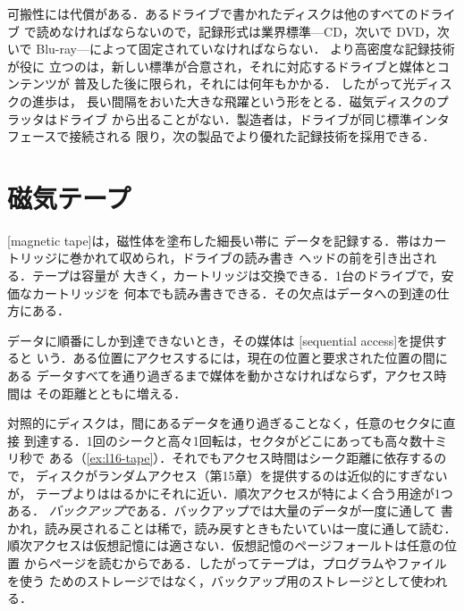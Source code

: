 \documentclass[../main.tex]{subfiles}
\begin{document}
可搬性には代償がある．あるドライブで書かれたディスクは他のすべてのドライブ
で読めなければならないので，記録形式は業界標準---CD，次いで DVD，次いで
Blu-ray---によって固定されていなければならない．
より高密度な記録技術が役に
立つのは，新しい標準が合意され，それに対応するドライブと媒体とコンテンツが
普及した後に限られ，それには何年もかかる．
したがって光ディスクの進歩は，
長い間隔をおいた大きな飛躍という形をとる．磁気ディスクのプラッタはドライブ
から出ることがない．製造者は，ドライブが同じ標準インタフェースで接続される
限り，次の製品でより優れた記録技術を採用できる．

\section{磁気テープ}
\label{sec:l16-tape}

[magnetic tape]は，磁性体を塗布した細長い帯に
データを記録する．帯はカートリッジに巻かれて収められ，ドライブの読み書き
ヘッドの前を引き出される．テープは容量が
大きく，カートリッジは交換できる．1台のドライブで，安価なカートリッジを
何本でも読み書きできる．その欠点はデータへの到達の仕方にある．

\begin{definition}[順次アクセス]
  データに順番にしか到達できないとき，その媒体は
  [sequential access]を提供すると
  いう．ある位置にアクセスするには，現在の位置と要求された位置の間にある
  データすべてを通り過ぎるまで媒体を動かさなければならず，アクセス時間は
  その距離とともに増える．
\end{definition}

対照的にディスクは，間にあるデータを通り過ぎることなく，任意のセクタに直接
到達する．1回のシークと高々1回転は，セクタがどこにあっても高々数十ミリ秒で
ある（\cref{ex:l16-tape}）．それでもアクセス時間はシーク距離に依存するので，
ディスクがランダムアクセス（第15章）を提供するのは近似的にすぎないが，
テープよりははるかにそれに近い．順次アクセスが特によく合う用途が1つある．
\emph{バックアップ}である．バックアップでは大量のデータが一度に通して
書かれ，読み戻されることは稀で，読み戻すときもたいていは一度に通して読む．
順次アクセスは仮想記憶には適さない．仮想記憶のページフォールトは任意の位置
からページを読むからである．したがってテープは，プログラムやファイルを使う
ためのストレージではなく，バックアップ用のストレージとして使われる．
\end{document}
